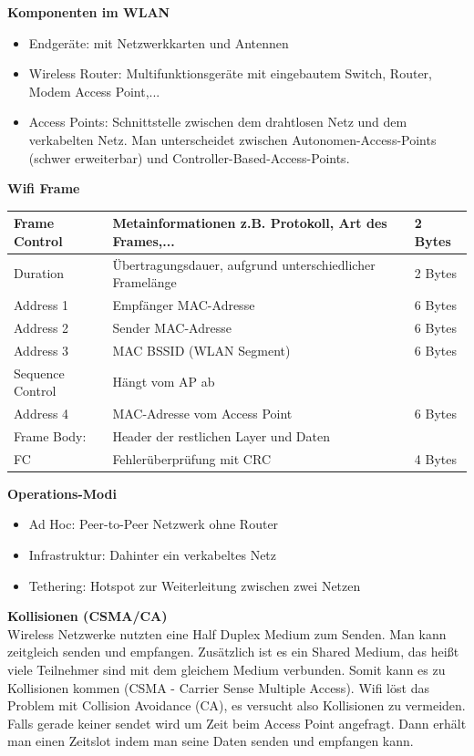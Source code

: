\textbf{Komponenten im WLAN}
\begin{itemize}
	\item Endgeräte: mit Netzwerkkarten und Antennen
	\item Wireless Router: Multifunktionsgeräte mit eingebautem Switch, Router, Modem Access Point,...
	\item Access Points: Schnittstelle zwischen dem drahtlosen Netz und dem verkabelten Netz. Man unterscheidet zwischen Autonomen-Access-Points (schwer erweiterbar) und Controller-Based-Access-Points.
\end{itemize}

\textbf{Wifi Frame} \\
\begin{tabular}{|l|l|l|}
	\hline
	Frame Control & Metainformationen z.B. Protokoll, Art des Frames,... & 2 Bytes \\
	\hline
	Duration & Übertragungsdauer, aufgrund unterschiedlicher Framelänge & 2 Bytes \\
	\hline
	Address 1 & Empfänger MAC-Adresse & 6 Bytes \\
	\hline
	Address 2 & Sender MAC-Adresse & 6 Bytes \\
	\hline
	Address 3 & MAC BSSID (WLAN Segment) & 6 Bytes \\
	\hline
	Sequence Control & Hängt vom AP ab &  \\
	\hline
	Address 4 & MAC-Adresse vom Access Point & 6 Bytes \\
	\hline
	Frame Body: & Header der restlichen Layer und Daten & \\
	\hline
	FC& Fehlerüberprüfung mit CRC & 4 Bytes \\
	\hline
\end{tabular}

\textbf{Operations-Modi}
\begin{itemize}
	\item Ad Hoc: Peer-to-Peer Netzwerk ohne Router
	\item Infrastruktur: Dahinter ein verkabeltes Netz
	\item Tethering: Hotspot zur Weiterleitung zwischen zwei Netzen 
\end{itemize}

\textbf{Kollisionen (CSMA/CA)} \\
Wireless Netzwerke nutzten eine Half Duplex Medium zum Senden. Man kann zeitgleich senden und empfangen. Zusätzlich ist es ein Shared Medium, das heißt viele Teilnehmer sind mit dem gleichem Medium verbunden. Somit kann es zu Kollisionen kommen (CSMA - Carrier Sense Multiple Access). Wifi löst das Problem mit Collision Avoidance (CA), es versucht also Kollisionen zu vermeiden. Falls gerade keiner sendet wird um Zeit beim Access Point angefragt. Dann erhält man einen Zeitslot indem man seine Daten senden und empfangen kann.

